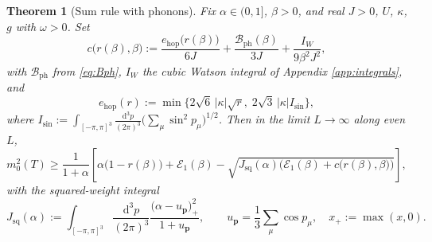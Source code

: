 \documentclass[11pt]{article}
\numberwithin{equation}{section}
\newcommand{\dd}{\mathrm{d}}
\newcommand{\ph}{\mathrm{ph}}
\newcommand{\hop}{\mathrm{hop}}
\newtheorem{theorem}{Theorem}[section]
\theoremstyle{definition}
\begin{document}
\begin{theorem}[Sum rule with phonons]\label{thm:sumrule}
Fix $\alpha\in(0,1]$, $\beta>0$, and real $J>0$, $U$, $\kappa$, $g$ with $\omega>0$. Set
\begin{equation}
c\big(r(\beta),\beta\big):=\frac{e_{\hop}\big(r(\beta)\big)}{6J}
+\frac{\mathcal{B}_{\ph}(\beta)}{3J}+\frac{I_{W}}{9\beta^{2}J^{2}},
\label{eq:cdef}
\end{equation}
with $\mathcal{B}_{\ph}$ from \eqref{eq:Bph}, $I_{W}$ the cubic Watson integral of Appendix
\ref{app:integrals}, and
\begin{equation}
e_{\hop}(r):=\min\Big\{2\sqrt6\,|\kappa|\sqrt r,\;2\sqrt3\,|\kappa|I_{\sin}\Big\},
\label{eq:ehop}
\end{equation}
where $I_{\sin}:=\int_{[-\pi,\pi]^{3}}\frac{\dd^{3}p}{(2\pi)^{3}}\big(\sum_{\mu}\sin^{2}p_{\mu}\big)^{1/2}$.
Then in the limit $L\to\infty$ along even $L$,
\begin{equation}
m_{0}^{2}(T)\ge\frac{1}{1+\alpha}\left[\alpha\big(1-r(\beta)\big)+\mathcal{E}_{1}(\beta)
-\sqrt{J_{\mathrm{sq}}(\alpha)\Big(\mathcal{E}_{1}(\beta)+c\big(r(\beta),\beta\big)\Big)}\right],
\label{eq:sumrule}
\end{equation}
with the squared-weight integral
\begin{equation}
J_{\mathrm{sq}}(\alpha):=\int_{[-\pi,\pi]^{3}}\frac{\dd^{3}p}{(2\pi)^{3}}\frac{\big(\alpha-u_{\mathbf p}\big)_{+}^{2}}{1+u_{\mathbf p}},
\qquad u_{\mathbf p}=\frac13\sum_{\mu}\cos p_{\mu},\quad x_{+}:=\max(x,0).
\label{eq:Jsq}
\end{equation}
\end{theorem}
\end{document}
